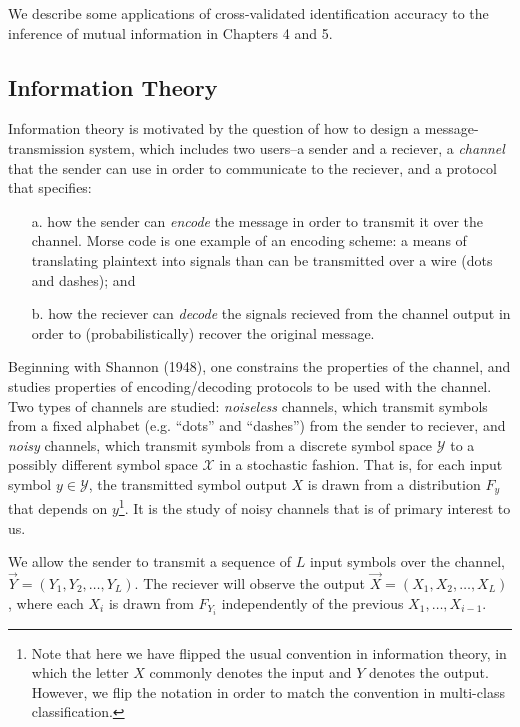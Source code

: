 We describe some applications of cross-validated identification
accuracy to the inference of mutual information in Chapters 4 and 5.

\subsection{Information Theory}\label{sec:intro_mi}


Information theory is motivated by the question of how to design a
message-transmission system, which includes two users--a sender and a
reciever, a \emph{channel} that the sender can use in order to
communicate to the reciever, and a protocol that specifies:
\begin{itemize}
\item[a.] how the sender can \emph{encode} the message in order to
  transmit it over the channel.  Morse code is one example of an
  encoding scheme: a means of translating plaintext into signals than
  can be transmitted over a wire (dots and dashes); and
\item[b.] how the reciever can \emph{decode} the signals recieved from
  the channel output in order to (probabilistically) recover the
  original message.
\end{itemize}

Beginning with Shannon (1948), one constrains the properties of the
channel, and studies properties of encoding/decoding protocols to be
used with the channel.  Two types of channels are studied:
\emph{noiseless} channels, which transmit symbols from a fixed
alphabet (e.g. ``dots'' and ``dashes'') from the sender to reciever,
and \emph{noisy} channels, which transmit symbols from a discrete
symbol space $\mathcal{Y}$ to a possibly different symbol space
$\mathcal{X}$ in a stochastic fashion.  That is, for each input symbol
$y \in \mathcal{Y}$, the transmitted symbol output $X$ is drawn from a
distribution $F_y$ that depends on $y$\footnote{Note that here we
  have flipped the usual convention in information theory, in which
  the letter $X$ commonly denotes the input and $Y$ denotes the
  output.  However, we flip the notation in order to match the
  convention in multi-class classification.}.  It is the study of
noisy channels that is of primary interest to us.

We allow the sender to transmit a sequence of $L$ input symbols over
the channel, $\vec{Y} = (Y_1,Y_2,\hdots, Y_L)$. The reciever will observe the
output $\vec{X} = (X_1,X_2,\hdots, X_L)$, where each $X_i$ is drawn from
$F_{Y_i}$ independently of the previous $X_1,\hdots, X_{i-1}$.


